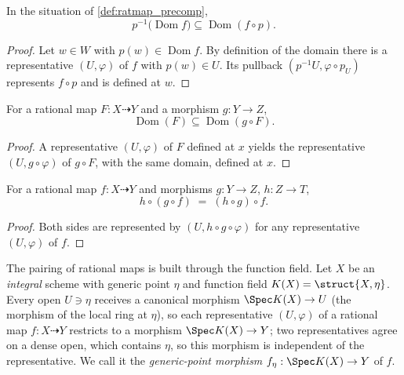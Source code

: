 \begin{lemma}
  \label{lem:ratmap_le_domain_precomp}
  \leanok
  In the situation of \ref{def:ratmap_precomp},
  \[
    p^{-1}\bigl(\operatorname{Dom} f\bigr) \subseteq \operatorname{Dom}(f \circ p).
  \]
\end{lemma}
\begin{proof}
  \leanok
  Let \(w \in W\) with \(p(w) \in \operatorname{Dom} f\). By definition of the
  domain there is a representative \((U, \varphi)\) of \(f\) with \(p(w) \in U\).
  Its pullback \((p^{-1}U, \varphi \circ p_U)\) represents \(f \circ p\) and is
  defined at \(w\).
\end{proof}

\begin{lemma}
  \label{lem:ratmap_le_domain_compHom}
  \leanok
  For a rational map \(F : X \dashrightarrow Y\) and a morphism \(g : Y \to Z\),
  \[
    \operatorname{Dom}(F) \subseteq \operatorname{Dom}(g \circ F).
  \]
\end{lemma}
\begin{proof}
  \leanok
  A representative \((U, \varphi)\) of \(F\) defined at \(x\) yields the
  representative \((U, g \circ \varphi)\) of \(g \circ F\), with the same
  domain, defined at \(x\).
\end{proof}

\begin{lemma}
  \label{lem:ratmap_compHom_compHom}
  \leanok
  For a rational map \(f : X \dashrightarrow Y\) and morphisms \(g : Y \to Z\),
  \(h : Z \to T\),
  \[
    h \circ (g \circ f) \;=\; (h \circ g) \circ f .
  \]
\end{lemma}
\begin{proof}
  \leanok
  Both sides are represented by \((U, h \circ g \circ \varphi)\) for any
  representative \((U, \varphi)\) of \(f\).
\end{proof}

The pairing of rational maps is built through the function field. Let \(X\) be
an \emph{integral} scheme with generic point \(\eta\) and function field
\(K(X) = \struct{X,\eta}\). Every open \(U \ni \eta\) receives a canonical
morphism \(\Spec K(X) \to U\) (the morphism of the local ring at \(\eta\)), so
each representative \((U, \varphi)\) of a rational map
\(f : X \dashrightarrow Y\) restricts to a morphism
\(\Spec K(X) \to Y\); two representatives agree on a dense open, which contains
\(\eta\), so this morphism is independent of the representative. We call it the
\emph{generic-point morphism} \(f_\eta : \Spec K(X) \to Y\) of \(f\).

